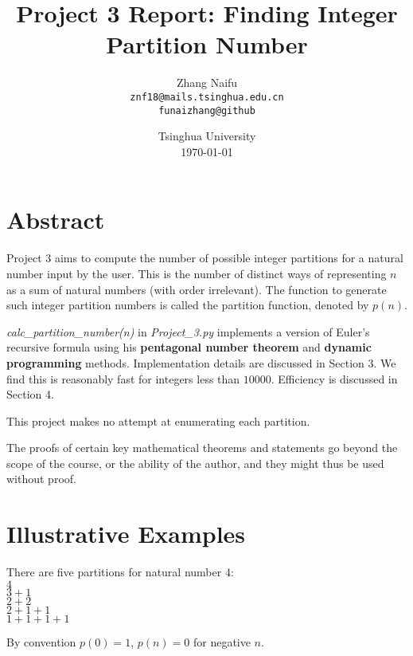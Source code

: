 \documentclass{article}
\title{Project 3 Report: Finding Integer Partition Number} %
\author{Zhang Naifu\\ \texttt{znf18@mails.tsinghua.edu.cn}\\ \texttt{funaizhang@github}}%
\date{Tsinghua University\\ \today} %
\begin{document}
\maketitle %


\section*{Abstract} %

Project 3 aims to compute the number of possible integer partitions for a natural number input by the user. This is the number of distinct ways of representing \(n\) as a sum of natural numbers (with order irrelevant). The function to generate such integer partition numbers is called the partition function, denoted by \(p(n)\). 

\textit{calc\_partition\_number(n)} in \textit{Project\_3.py} implements a version of Euler's recursive formula using his \textbf{pentagonal number theorem} and \textbf{dynamic programming} methods. Implementation details are discussed in Section 3. We find this is reasonably fast for integers less than \(10000\). Efficiency is discussed in Section 4.

This project makes no attempt at enumerating each partition.

The proofs of certain key mathematical theorems and statements go beyond the scope of the course, or the ability of the author, and they might thus be used without proof.


\section{Illustrative Examples}

\begin{question}[\itshape]
There are five partitions for natural number 4:\\
\(4\)\\
\(3+1\)\\
\(2+2\)\\
\(2+1+1\)\\
\(1+1+1+1\)
\end{question}
\begin{question}[\itshape]
By convention \(p(0)=1\), \(p(n)=0\) for negative \(n\).
\end{question}
\end{document}
